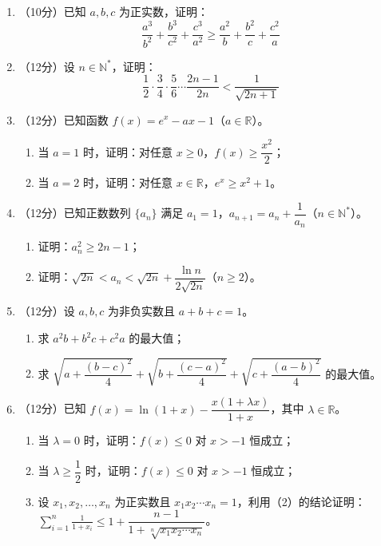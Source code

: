 \documentclass[12pt, a4paper]{ctexart}
\begin{document}
\begin{enumerate}[resume]
\item （10分）已知 $a, b, c$ 为正实数，证明：
$$\frac{a^3}{b^2} + \frac{b^3}{c^2} + \frac{c^3}{a^2} \geqslant \frac{a^2}{b} + \frac{b^2}{c} + \frac{c^2}{a}$$

\item （12分）设 $n \in \mathbb{N}^*$，证明：
$$\frac{1}{2} \cdot \frac{3}{4} \cdot \frac{5}{6} \cdots \frac{2n-1}{2n} < \frac{1}{\sqrt{2n+1}}$$

\item （12分）已知函数 $f(x) = e^x - ax - 1$（$a \in \mathbb{R}$）。
\begin{enumerate}[label=(\arabic*)]
\item 当 $a = 1$ 时，证明：对任意 $x \geqslant 0$，$f(x) \geqslant \dfrac{x^2}{2}$；
\item 当 $a = 2$ 时，证明：对任意 $x \in \mathbb{R}$，$e^x \geqslant x^2 + 1$。
\end{enumerate}

\item （12分）已知正数数列 $\{a_n\}$ 满足 $a_1 = 1$，$a_{n+1} = a_n + \dfrac{1}{a_n}$（$n \in \mathbb{N}^*$）。
\begin{enumerate}[label=(\arabic*)]
\item 证明：$a_n^2 \geqslant 2n - 1$；
\item 证明：$\sqrt{2n} < a_n < \sqrt{2n} + \dfrac{\ln n}{2\sqrt{2n}}$（$n \geqslant 2$）。
\end{enumerate}

\item （12分）设 $a, b, c$ 为非负实数且 $a + b + c = 1$。
\begin{enumerate}[label=(\arabic*)]
\item 求 $a^2 b + b^2 c + c^2 a$ 的最大值；
\item 求 $\sqrt{a + \dfrac{(b-c)^2}{4}} + \sqrt{b + \dfrac{(c-a)^2}{4}} + \sqrt{c + \dfrac{(a-b)^2}{4}}$ 的最大值。
\end{enumerate}

\item （12分）已知 $f(x) = \ln(1+x) - \dfrac{x(1+\lambda x)}{1+x}$，其中 $\lambda \in \mathbb{R}$。
\begin{enumerate}[label=(\arabic*)]
\item 当 $\lambda = 0$ 时，证明：$f(x) \leqslant 0$ 对 $x > -1$ 恒成立；
\item 当 $\lambda \geqslant \dfrac{1}{2}$ 时，证明：$f(x) \leqslant 0$ 对 $x > -1$ 恒成立；
\item 设 $x_1, x_2, \ldots, x_n$ 为正实数且 $x_1 x_2 \cdots x_n = 1$，利用（2）的结论证明：$\displaystyle\sum_{i=1}^{n} \frac{1}{1+x_i} \leqslant 1 + \dfrac{n-1}{1 + \sqrt[n]{x_1 x_2 \cdots x_n}}$。\end{enumerate}

\end{enumerate}
\end{document}
